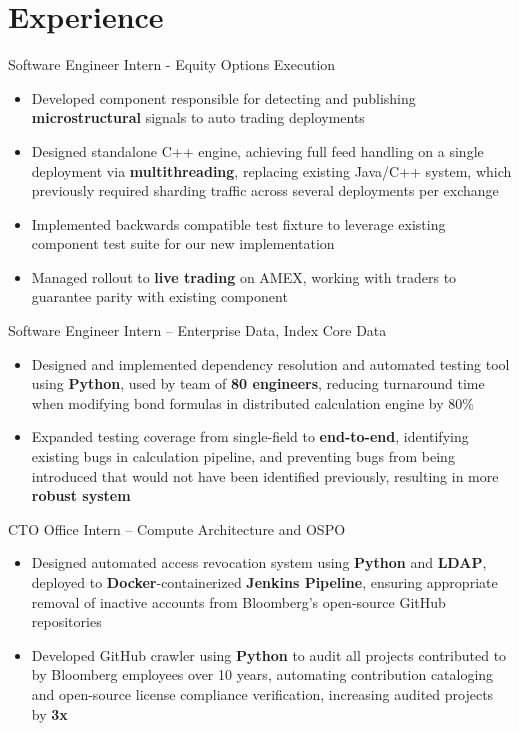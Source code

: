 \documentclass[letterpaper,11pt]{article}
\begin{document}
\section{Experience}
{Software Engineer Intern - Equity Options Execution}{}
\begin{itemize}
  \item Developed component responsible for detecting and publishing \textbf{microstructural}
        signals to auto trading deployments
  \item Designed standalone C++ engine, achieving full feed handling on a single
        deployment via \textbf{multithreading}, replacing existing Java/C++ system, which
        previously required sharding traffic across several deployments per exchange
  \item Implemented backwards compatible test fixture to leverage existing component
        test suite for our new implementation
  \item Managed rollout to \textbf{live trading} on AMEX, working with traders to guarantee parity
        with existing component
\end{itemize}
{Software Engineer Intern -- Enterprise Data, Index Core Data}{}
\begin{itemize}
  \item Designed and implemented dependency resolution and automated testing
        tool using \textbf{Python}, used by team of \textbf{80 engineers},
        reducing turnaround time when modifying bond formulas in distributed
        calculation engine by 80\%
  \item Expanded testing coverage from single-field to \textbf{end-to-end}, identifying
        existing bugs in calculation pipeline, and preventing bugs from being
        introduced that would not have been identified previously, resulting in
        more \textbf{robust system}
\end{itemize}
{CTO Office Intern -- Compute Architecture and OSPO}{}
\begin{itemize}
  \item Designed automated access revocation system using \textbf{Python} and
        \textbf{LDAP}, deployed to \textbf{Docker}-containerized
        \textbf{Jenkins Pipeline}, ensuring appropriate removal of inactive
        accounts from Bloomberg's open-source GitHub repositories
  \item Developed GitHub crawler using \textbf{Python} to audit all projects
        contributed to by Bloomberg employees over 10 years, automating
        contribution cataloging and open-source license compliance
        verification, increasing audited projects by \textbf{3x}
\end{itemize}
\end{document}
